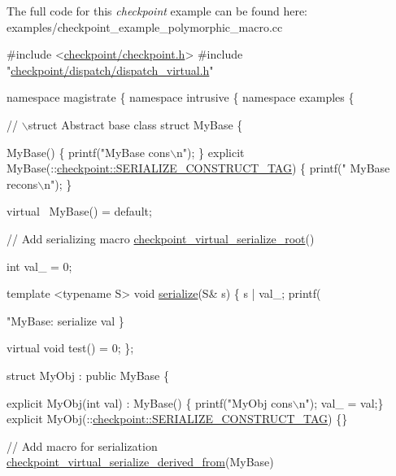 The full code for this {\itshape checkpoint} example can be found here\+: {\ttfamily examples/checkpoint\+\_\+example\+\_\+polymorphic\+\_\+macro.\+cc}


\begin{DoxyCodeInclude}

\textcolor{preprocessor}{#include <\hyperlink{checkpoint_8h}{checkpoint/checkpoint.h}>}
\textcolor{preprocessor}{#include "\hyperlink{dispatch__virtual_8h}{checkpoint/dispatch/dispatch\_virtual.h}"}

\textcolor{keyword}{namespace }magistrate \{ \textcolor{keyword}{namespace }intrusive \{ \textcolor{keyword}{namespace }examples \{

\textcolor{comment}{// \(\backslash\)struct Abstract base class}
\textcolor{keyword}{struct }MyBase \{

  MyBase() \{ printf(\textcolor{stringliteral}{"MyBase cons\(\backslash\)n"}); \}
  \textcolor{keyword}{explicit} MyBase(::\hyperlink{structcheckpoint_1_1dispatch_1_1_s_e_r_i_a_l_i_z_e___c_o_n_s_t_r_u_c_t___t_a_g}{checkpoint::SERIALIZE\_CONSTRUCT\_TAG}) \{ printf(\textcolor{stringliteral}{"
      MyBase recons\(\backslash\)n"}); \}

  \textcolor{keyword}{virtual} ~MyBase() = \textcolor{keywordflow}{default};

  \textcolor{comment}{// Add serializing macro}
  \hyperlink{lib_2checkpoint_2src_2checkpoint_2dispatch_2vrt_2base_8h_aa6062a11e9781a28fe043f10338238df}{checkpoint\_virtual\_serialize\_root}()

  int val\_ = 0;

  template <typename S>
  \textcolor{keywordtype}{void} \hyperlink{namespacecheckpoint_a075da4e7344cf037943362517e606c3a}{serialize}(S& s) \{
    s | val\_;
    printf(\textcolor{stringliteral}{"MyBase: serialize val %
  \}

  \textcolor{keyword}{virtual} \textcolor{keywordtype}{void} test() = 0;
\};

\textcolor{keyword}{struct }MyObj : \textcolor{keyword}{public} MyBase \{

  \textcolor{keyword}{explicit} MyObj(\textcolor{keywordtype}{int} val) : MyBase() \{ printf(\textcolor{stringliteral}{"MyObj cons\(\backslash\)n"}); val\_ = val;\}
  \textcolor{keyword}{explicit} MyObj(::\hyperlink{structcheckpoint_1_1dispatch_1_1_s_e_r_i_a_l_i_z_e___c_o_n_s_t_r_u_c_t___t_a_g}{checkpoint::SERIALIZE\_CONSTRUCT\_TAG}) \{\}

  \textcolor{comment}{// Add macro for serialization}
  \hyperlink{derived_8h_acc015406441054fae32d63af2b86ca0d}{checkpoint\_virtual\_serialize\_derived\_from}(MyBase)

}
\end{DoxyCodeInclude}
